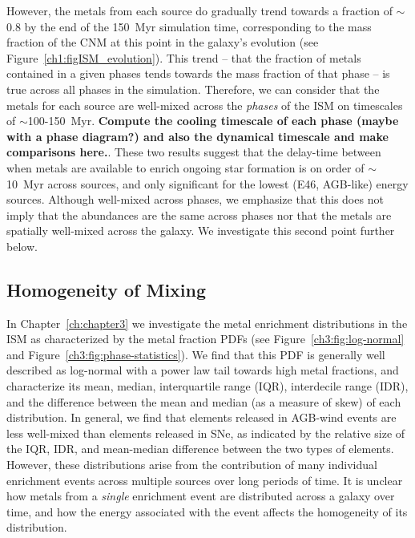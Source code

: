 However, the metals from each source do gradually trend towards a fraction of $\sim$0.8 by the end of the 150~Myr simulation time, corresponding to the mass fraction of the CNM at this point in the galaxy's evolution (see Figure~\ref{ch1:figISM_evolution}). This trend -- that the fraction of metals contained in a given phases tends towards the mass fraction of that phase -- is true across all phases in the simulation. Therefore, we can consider that the metals for each source are well-mixed across the \textit{phases} of the ISM on timescales of $\sim$100-150~Myr. \textbf{Compute the cooling timescale of each phase (maybe with a phase diagram?) and also the dynamical timescale and make comparisons here.}. These two results suggest that the delay-time between when metals are available to enrich ongoing star formation is on order of $\sim$10~Myr across sources, and only significant for the lowest (E46, AGB-like) energy sources. Although well-mixed across phases, we emphasize that this does not imply that the abundances are the same across phases nor that the metals are spatially well-mixed across the galaxy. We investigate this second point further below.

\subsection{Homogeneity of Mixing}
\label{ch4:sec:spreads}

In Chapter~\ref{ch:chapter3} we investigate the metal enrichment distributions in the ISM as characterized by the metal fraction PDFs (see Figure~\ref{ch3:fig:log-normal} and Figure~\ref{ch3:fig:phase-statistics}). We find that this PDF is generally well described as log-normal with a power law tail towards high metal fractions, and characterize its mean, median, interquartile range (IQR), interdecile range (IDR), and the difference between the mean and median (as a measure of skew) of each distribution. In general, we find that elements released in AGB-wind events are less well-mixed than elements released in SNe, as indicated by the relative size of the IQR, IDR, and mean-median difference between the two types of elements. However, these distributions arise from the contribution of many individual enrichment events across multiple sources over long periods of time. It is unclear how metals from a \textit{single} enrichment event are distributed across a galaxy over time, and how the energy associated with the event affects the homogeneity of its distribution.

